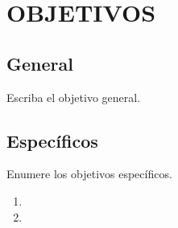 \chapter{OBJETIVOS}

\section*{General}
Escriba el objetivo general.


\section*{Específicos}
Enumere los objetivos específicos.
\begin{enumerate}
\item 
\item 
\end{enumerate}

